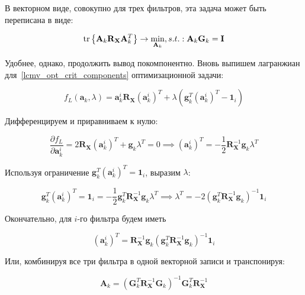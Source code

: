 В векторном виде, совокупно для трех фильтров, эта задача может быть переписана
в виде:

\begin{equation}
    \operatorname{tr}\left\{
        \mathbf{A}_k \mathbf{R}_\mathbf{X}\mathbf{A}_k^T
    \right\} \rightarrow \underset{\mathbf{A}_k}{\min},
    s.t.: \mathbf{A}_k \mathbf{G}_k =  \mathbf{I}
    \label{lcmv_opt_criterion_vec}
\end{equation}

Удобнее, однако, продолжить вывод покомпонентно.
Вновь выпишем лагранжиан для~\ref{lcmv_opt_crit_components} оптимизационной задачи:

\begin{equation}
    f_L{(\mathbf{a}_k, \lambda) = \mathbf{a}_k^i \mathbf{R}_\mathbf{X} (\mathbf{a}_k^i)}^T +
    \lambda {(\mathbf{g}_k^T {(\mathbf{a}_k^i)}^T - \mathbf{1}_i)}
\end{equation}

Дифференцируем и приравниваем к нулю:

\begin{equation}
    \frac{\partial f_L}{\partial \mathbf{a}_k^i} =
    2 \mathbf{R}_\mathbf{X} {(\mathbf{a}_k^i)}^T + \mathbf{g}_k \lambda^T = 0 \implies
    {(\mathbf{a}_k^i)}^T = - \frac{1}{2}\mathbf{R}_\mathbf{X}^{-1} \mathbf{g}_k \lambda^T
\end{equation}

Используя ограничение $\mathbf{g}_k^T {(\mathbf{a}_k^i)}^T = \mathbf{1}_i$, выразим $\lambda$:

\begin{equation}
    \mathbf{g}_k^T {(\mathbf{a}_k^i)}^T = \mathbf{1}_i =
    - \frac{1}{2}\mathbf{g}_k^T\mathbf{R}_\mathbf{X}^{-1} \mathbf{g}_k \lambda^T \implies
    \lambda^T = - 2{(\mathbf{g}_k^T\mathbf{R}_\mathbf{X}^{-1} \mathbf{g}_k)}^{-1} \mathbf{1}_i
\end{equation}

Окончательно, для $i$-го фильтра будем иметь

\begin{equation}
    {(\mathbf{a}_k^i)}^T = \mathbf{R}_\mathbf{X}^{-1} \mathbf{g}_k{(\mathbf{g}_k^T\mathbf{R}_\mathbf{X}^{-1} \mathbf{g}_k)}^{-1} \mathbf{1}_i
    \label{lcmv_filters_vec_comp}
\end{equation}

Или, комбинируя все три фильтра в одной векторной записи и транспонируя:

\begin{equation}
    \mathbf{A}_k =
    {(\mathbf{G}_k^T\mathbf{R}_\mathbf{X}^{-1} \mathbf{G}_k)}^{-1} \mathbf{G}_k^T \mathbf{R}_\mathbf{X}^{-1}
    \label{lcmv_filters_vec}
\end{equation}


